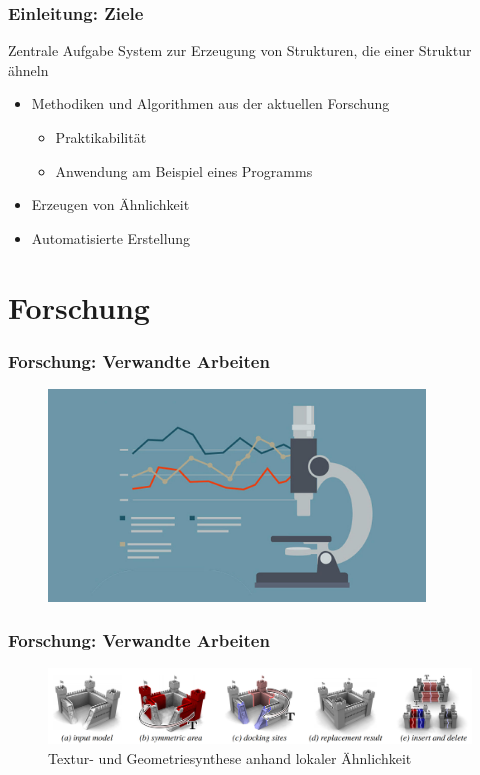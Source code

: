 \documentclass[12pt]{beamer}
\begin{document}
    \begin{frame}
        \frametitle{Einleitung: Ziele}

        \begin{block}{Zentrale Aufgabe}
            System zur Erzeugung von Strukturen, die einer Struktur ähneln
        \end{block}

        \begin{itemize}
            \setlength\itemsep{1.4em}
            \item<2-> Methodiken und Algorithmen aus der aktuellen Forschung
            \begin{itemize}
                \item Praktikabilität
                \item Anwendung am Beispiel eines Programms
            \end{itemize}
            \item<3-> Erzeugen von Ähnlichkeit
            \item<4-> Automatisierte Erstellung
        \end{itemize}
    \end{frame}

    \section{Forschung}
    \label{sec:forschung}
    \begin{frame}
        \frametitle{Forschung: Verwandte Arbeiten}

        \begin{figure}
            \centering
            \includegraphics[width=10cm]{../images/forschung.jpg}
        \end{figure}
    \end{frame}

    \begin{frame}
        \frametitle{Forschung: Verwandte Arbeiten}

        \begin{figure}
            \centering
            \includegraphics[width=12cm]{../images/bokeloh_2010_system.PNG}
            \caption{Textur- und Geometriesynthese anhand lokaler Ähnlichkeit}
        \end{figure}
    \end{frame}
\end{document}
